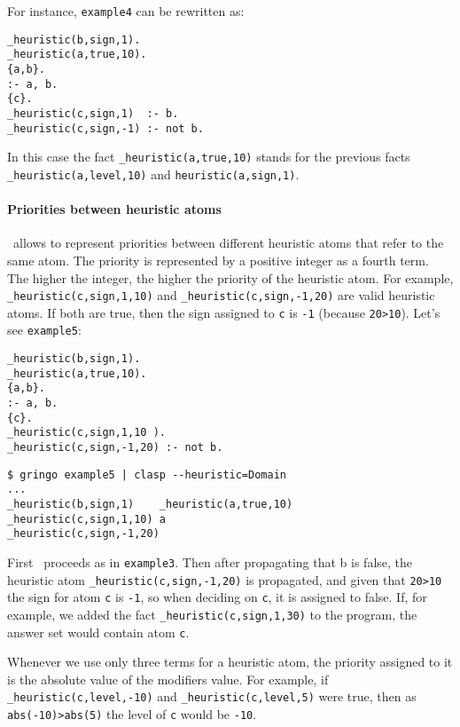 For instance, \texttt{example4} can be rewritten as:
\begin{lstlisting}[numbers=none]
_heuristic(b,sign,1).
_heuristic(a,true,10).
{a,b}.
:- a, b.
{c}.
_heuristic(c,sign,1)  :- b.
_heuristic(c,sign,-1) :- not b.
\end{lstlisting}

In this case the fact \texttt{\_heuristic(a,true,10)} stands for the previous
facts \texttt{\_heuristic(a,level,10)} and \texttt{heuristic(a,sign,1)}.

\paragraph{Priorities between heuristic atoms}

\clasp\ allows to represent priorities between different heuristic atoms that refer to the same atom.
The priority is represented by a positive integer as a fourth term.
The higher the integer, the higher the priority of the heuristic atom.
For example, \texttt{\_heuristic(c,sign,1,10)} and \texttt{\_heuristic(c,sign,-1,20)} are valid heuristic atoms.
If both are true, then the sign assigned to \texttt{c} is \texttt{-1} (because \texttt{20>10}).  Let's see \texttt{example5}:
\begin{lstlisting}[numbers=none]
_heuristic(b,sign,1).
_heuristic(a,true,10).
{a,b}.
:- a, b.
{c}.
_heuristic(c,sign,1,10 ).
_heuristic(c,sign,-1,20) :- not b.
\end{lstlisting}
\begin{lstlisting}[numbers=none]
$ gringo example5 | clasp --heuristic=Domain
...
_heuristic(b,sign,1)    _heuristic(a,true,10)
_heuristic(c,sign,1,10) a
_heuristic(c,sign,-1,20)\end{lstlisting}

First \clasp\ proceeds as in \texttt{example3}.
Then after propagating that b is false,  the heuristic atom \texttt{\_heuristic(c,sign,-1,20)} is propagated,
and given that \texttt{20>10} the sign for atom \texttt{c} is \texttt{-1}, so when deciding on \texttt{c}, it is assigned to false.
If, for example, we added the fact \texttt{\_heuristic(c,sign,1,30)} to the program, the answer set would contain atom \texttt{c}.

Whenever we use only three terms for a heuristic atom, the priority assigned to it is the absolute value of the modifiers value.
For example, if \texttt{\_heuristic(c,level,-10)} and \texttt{\_heuristic(c,level,5)} were true,
then as \texttt{abs(-10)>abs(5)} the level of \texttt{c} would be \texttt{-10}.

